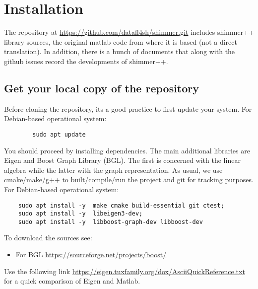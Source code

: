 \section{Installation}

The repository at  \url{https://github.com/datafl4sh/shimmer.git}  includes shimmer++ library sources, the original matlab code from where it is based (not a direct translation). In addition, there is a bunch of documents that along with the github issues record the developments of shimmer++.  
\subsection{Get your local copy of the repository}
Before cloning the repository, its a good practice to first update your system. For Debian-based operational system: 
    \begin{verbatim}
        sudo apt update
    \end{verbatim}    
You should proceed by installing dependencies. The main additional libraries are Eigen and Boost Graph Library (BGL). The first is concerned with the linear algebra while the latter with the graph representation. As usual,  we use cmake/make/g++ to built/compile/run the project and git for tracking purposes.  
For Debian-based operational system: 
\begin{verbatim}
    sudo apt install -y  make cmake build-essential git ctest; 
    sudo apt install -y  libeigen3-dev;
    sudo apt install -y  libboost-graph-dev libboost-dev
\end{verbatim}
To download the sources see:
\begin{itemize}
    \item For BGL \url{https://sourceforge.net/projects/boost/}
\end{itemize}

Use the following link \url{https://eigen.tuxfamily.org/dox/AsciiQuickReference.txt} for a quick comparison of Eigen and Matlab.

